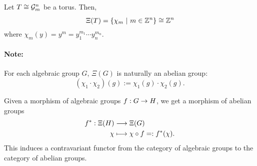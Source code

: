 \begin{example}
Let $T \overset{}{\cong} \mathcal{G}_m^n$ be a torus. Then,
\[ \Xi(T) = \left\lbrace\chi_m ~ | ~ m \in \mathbb{Z}^n\right\rbrace \overset{}{\cong} \mathbb{Z}^n \]
where $\chi_m(y) = y^m = y_1^{m_1}\cdots y_n^{m_n}.$
\end{example}
\paragraph{Note:} For each algebraic group $G$, $\Xi(G)$ is naturally an abelian group:
\[ (\chi_1 \cdot \chi_2)(g) := \chi_1(g) \cdot \chi_2(g). \]


Given a morphism of algebraic groups $f : G \overset{}{\rightarrow} H$, we get a morphism of abelian groups
\begin{align*}
f^* : \Xi(H) & \overset{}{\longrightarrow} \Xi(G)\\
\chi & \longmapsto \chi \circ f =: f^*(\chi).
\end{align*}
This induces a contravariant functor from the category of algebraic groups to the category of abelian groups.

